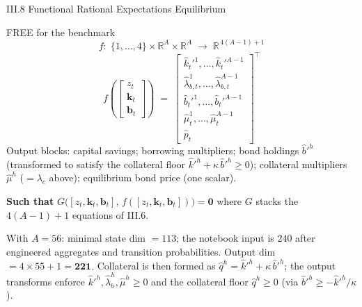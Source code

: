 \documentclass[aspectratio=169,11pt]{beamer}
\newcommand{\R}{\mathbb{R}}
\begin{document}
\begin{frame}{III.8 Functional Rational Expectations Equilibrium}
\small
\begin{exampleblock}{FREE for the benchmark}
\vspace{-3pt}
\[
f:\;\{1,\ldots,4\}\times \R^{A}\times \R^{A} \;\longrightarrow\; \R^{\,4(A-1)+1}
\]
\[
f\!\left(\!\begin{bmatrix} z_t \\ \bm{k}_t \\ \bm{b}_t \end{bmatrix}\!\right)
\;=\;
\begin{bmatrix}
\hat{k}_t'^1,\ldots,\hat{k}_t'^{A-1} \\
\hat\lambda_{b,t}^1,\ldots,\hat\lambda_{b,t}^{A-1} \\
\hat{b}_t'^1,\ldots,\hat{b}_t'^{A-1} \\
\hat \mu_{t}^{1},\ldots,\hat \mu_{t}^{A-1} \\
\hat p_t
\end{bmatrix}^{\!\top}
\]
{\footnotesize Output blocks: capital savings; borrowing multipliers; bond holdings $\hat b'^h$ (transformed to satisfy the collateral floor $\hat k'^h + \kappa\,\hat b'^h \ge 0$); collateral multipliers $\hat\mu^h$ ($=\lambda_c$ above); equilibrium bond price (one scalar).}
\vspace{-3pt}\end{exampleblock}

\textbf{Such that} $G\bigl([z_t, \bm{k}_t, \bm{b}_t],\,f([z_t, \bm{k}_t, \bm{b}_t])\bigr) = \bm{0}$ where $G$ stacks the $4(A-1)+1$ equations of III.6.

\vspace{0.3em}
{\footnotesize With $A = 56$: minimal state dim $=113$; the notebook input is $240$ after engineered aggregates and transition probabilities.  Output dim $=4\times55+1=\bm{221}$.  Collateral is then formed as $\hat q^h=\hat k'^h+\kappa\,\hat b'^h$; the output transforms enforce $\hat k'^h,\hat\lambda_b^h,\hat\mu^h\ge0$ and the collateral floor $\hat q^h\ge0$ (via $\hat b'^h\ge-\hat k'^h/\kappa$).}
\end{frame}
\end{document}
